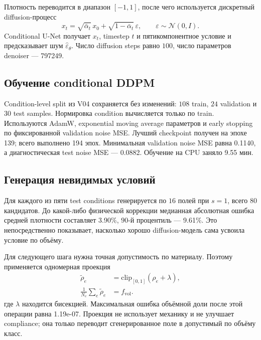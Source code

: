 Плотность переводится в диапазон $[-1,1]$, после чего используется дискретный diffusion-процесс
\begin{equation}
\label{eq:practical-v07-forward}
 x_t
 =
 \sqrt{\bar\alpha_t}\,x_0
 +
 \sqrt{1-\bar\alpha_t}\,\varepsilon,
 \qquad
 \varepsilon\sim\mathcal N(0,I).
\end{equation}
Conditional U-Net получает $x_t$, timestep $t$ и пятикомпонентное условие и предсказывает шум $\widehat\varepsilon_\theta$. Число diffusion steps равно $100$, число параметров denoiser --- 797249.

\subsection{Обучение conditional DDPM}
\label{subsec:practical-v07-training}

Condition-level split из V04 сохраняется без изменений: $108$ train, $24$ validation и $30$ test samples. Нормировка condition вычисляется только по train. Используются AdamW, exponential moving average параметров и early stopping по фиксированной validation noise MSE. Лучший checkpoint получен на эпохе 139; всего выполнено 194 эпох. Минимальная validation noise MSE равна 0.1140, а диагностическая test noise MSE --- 0.0882. Обучение на CPU заняло 9.55 мин.

\subsection{Генерация невидимых условий}
\label{subsec:practical-v07-sampling}

Для каждого из пяти test conditions генерируется по $16$ полей при $s=1$, всего $80$ кандидатов. До какой-либо физической коррекции медианная абсолютная ошибка средней плотности составляет 3.90\%, $90$-й процентиль --- 9.61\%. Это непосредственно показывает, насколько хорошо diffusion-модель сама усвоила условие по объёму.

Для следующего шага нужна точная допустимость по материалу. Поэтому применяется одномерная проекция
\begin{equation}
\label{eq:practical-v07-volume-projection}
 \begin{aligned}
  \widetilde\rho_e
  &=
  \mathrm{clip}_{[0,1]}
  \left(
  \rho_e+\lambda
  \right),
  \\
  \frac{1}{N_e}
  \sum_e
  \widetilde\rho_e
  &=
  f_{\mathrm{vol}}.
 \end{aligned}
\end{equation}
где $\lambda$ находится бисекцией. Максимальная ошибка объёмной доли после этой операции равна 1.19e-07. Проекция не использует механику и не улучшает compliance; она только переводит сгенерированное поле в допустимый по объёму класс.

